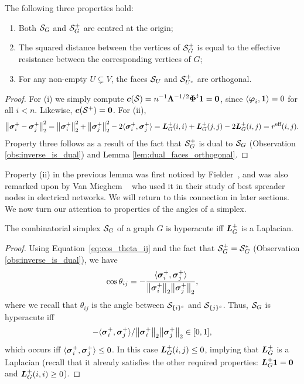 \begin{lemma}
	\label{lem:S_G_basic_properties}
	The following three properties hold: 
	\begin{enumerate}
		\item 	Both $\mathcal{S}_G$ and $\mathcal{S}_G^+$ are centred at the origin;
		\item The squared distance between the vertices of $\mathcal{S}_G^+$ is equal to the effective resistance between the corresponding vertices of $G$; 
		\item For any non-empty $U\subsetneq V$, the faces $\mathcal{S}_U$ and $\mathcal{S}^+_{U^c}$ are orthogonal. 
	\end{enumerate}
\end{lemma}
\begin{proof}
	For (i) we  simply compute $\vb*{c}(\mathcal{S}) = n^{-1}\vb{\Lambda}^{-1/2}\boldsymbol{\Phi}^t \vb{1} =\vb{0}$, since $\langle \vb*{\varphi}_i,\vb{1}\rangle =0$ for all $i<n$.  Likewise, $\vb*{c}(\mathcal{S}^+)=\vb{0}$. For (ii), 
	\begin{equation*}
	\norm{\vb*{\sigma}_i^+-\vb*{\sigma}_j^+}_2^2 = \norm{\vb*{\sigma}_i^+}_2^2 + \norm{\vb*{\sigma}_j^+}_2^2 - 2\langle \vb*{\sigma}_i^+,\vb*{\sigma}_j^+\rangle = \vb*{L}_G^+(i,i) + \vb*{L}_G^+(j,j) - 2\vb*{L}_G^+(i,j) = r^{\text{eff}}(i,j).
	\end{equation*}
	Property three follows as a result of the fact that $\mathcal{S}_G^+$ is dual to $\mathcal{S}_G$ (Observation \ref{obs:inverse_is_dual}) and Lemma \ref{lem:dual_faces_orthogonal}. 
\end{proof}




Property (ii) in the previous lemma was first noticed by Fielder~\cite[Chapter 6]{fiedler2011matrices}, and was also remarked upon by Van Mieghem \etal~\cite{van2017pseudoinverse} who used it in their study of best spreader nodes in electrical networks. We will return to this connection in later sections. We now turn our attention to properties of the angles of a simplex.  

\begin{lemma}
	The combinatorial simplex $\mathcal{S}_G$ of a graph $G$ is hyperacute iff $\vb*{L}_G^+$ is a Laplacian.
\end{lemma}
\begin{proof}
	Using Equation~\eqref{eq:cos_theta_ij} and the fact that $\mathcal{S}_G^+=\mathcal{S}_G^*$ (Observation \ref{obs:inverse_is_dual}), we have
	\[\cos \theta_{ij} = -\frac{\langle \vb*{\sigma}_i^+,\vb*{\sigma}_j^+\rangle }{\norm{\vb*{\sigma}_i^+}_2 \norm{\vb*{\sigma}_j^+}_2},\]
	where we recall that $\theta_{ij}$ is the angle between $\mathcal{S}_{\{i\}^c}$ and $\mathcal{S}_{\{j\}^c}$. Thus, $\mathcal{S}_G$ is hyperacute iff
	 \[-\langle \vb*{\sigma}_i^+,\vb*{\sigma}_j^+\rangle\\/\norm{\vb*{\sigma}_i^+}_2 \norm{\vb*{\sigma}_j^+}_2 \in[0,1],\] which occurs iff $\langle \vb*{\sigma}_i^+,\vb*{\sigma}_j^+\rangle \leq 0$. In this case $\vb*{L}_G^+(i,j)\leq 0$, implying that $\vb*{L}_G^+$ is a Laplacian (recall that it already satisfies the other required properties: $\vb*{L}_G^+\vb{1}=\vb{0}$ and $\vb*{L}_G^+(i,i)\geq 0$). 
\end{proof}

